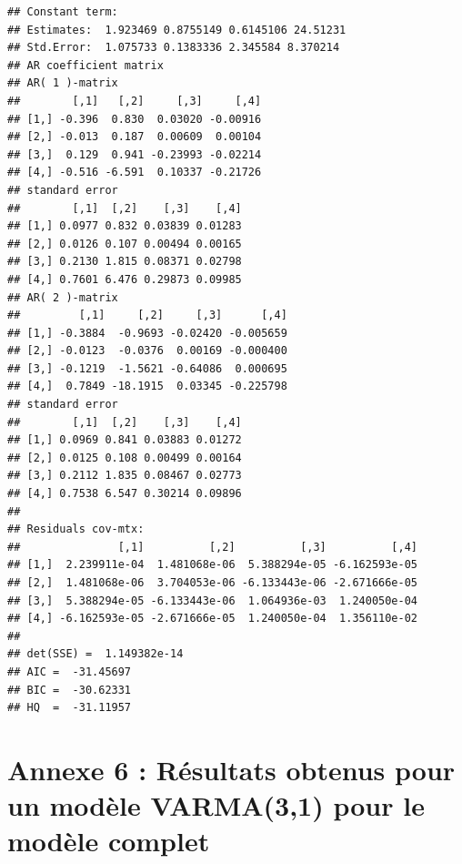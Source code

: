\documentclass[11pt,]{article}
\begin{document}
\begin{verbatim}
## Constant term: 
## Estimates:  1.923469 0.8755149 0.6145106 24.51231 
## Std.Error:  1.075733 0.1383336 2.345584 8.370214 
## AR coefficient matrix 
## AR( 1 )-matrix 
##        [,1]   [,2]     [,3]     [,4]
## [1,] -0.396  0.830  0.03020 -0.00916
## [2,] -0.013  0.187  0.00609  0.00104
## [3,]  0.129  0.941 -0.23993 -0.02214
## [4,] -0.516 -6.591  0.10337 -0.21726
## standard error 
##        [,1]  [,2]    [,3]    [,4]
## [1,] 0.0977 0.832 0.03839 0.01283
## [2,] 0.0126 0.107 0.00494 0.00165
## [3,] 0.2130 1.815 0.08371 0.02798
## [4,] 0.7601 6.476 0.29873 0.09985
## AR( 2 )-matrix 
##         [,1]     [,2]     [,3]      [,4]
## [1,] -0.3884  -0.9693 -0.02420 -0.005659
## [2,] -0.0123  -0.0376  0.00169 -0.000400
## [3,] -0.1219  -1.5621 -0.64086  0.000695
## [4,]  0.7849 -18.1915  0.03345 -0.225798
## standard error 
##        [,1]  [,2]    [,3]    [,4]
## [1,] 0.0969 0.841 0.03883 0.01272
## [2,] 0.0125 0.108 0.00499 0.00164
## [3,] 0.2112 1.835 0.08467 0.02773
## [4,] 0.7538 6.547 0.30214 0.09896
##   
## Residuals cov-mtx: 
##               [,1]          [,2]          [,3]          [,4]
## [1,]  2.239911e-04  1.481068e-06  5.388294e-05 -6.162593e-05
## [2,]  1.481068e-06  3.704053e-06 -6.133443e-06 -2.671666e-05
## [3,]  5.388294e-05 -6.133443e-06  1.064936e-03  1.240050e-04
## [4,] -6.162593e-05 -2.671666e-05  1.240050e-04  1.356110e-02
##   
## det(SSE) =  1.149382e-14 
## AIC =  -31.45697 
## BIC =  -30.62331 
## HQ  =  -31.11957
\end{verbatim}

\section{\texorpdfstring{Annexe 6 : Résultats obtenus pour un modèle
VARMA(3,1) pour le modèle complet
\label{Annexe6}}{Annexe 6 : Résultats obtenus pour un modèle VARMA(3,1) pour le modèle complet }}\label{annexe-6-resultats-obtenus-pour-un-modele-varma31-pour-le-modele-complet}
\end{document}

